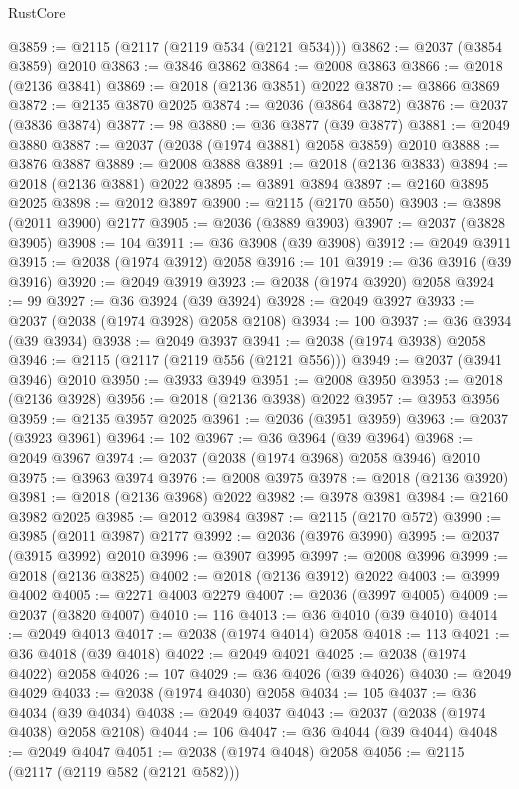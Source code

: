 \begin{lexlean}{RustCore}
\begin{coremodule}
@3859 := @2115 (@2117 (@2119 @534 (@2121 @534)))
@3862 := @2037 (@3854 @3859) @2010
@3863 := @3846 @3862
@3864 := @2008 @3863
@3866 := @2018 (@2136 @3841)
@3869 := @2018 (@2136 @3851) @2022
@3870 := @3866 @3869
@3872 := @2135 @3870 @2025
@3874 := @2036 (@3864 @3872)
@3876 := @2037 (@3836 @3874)
@3877 := 98
@3880 := @36 @3877 (@39 @3877)
@3881 := @2049 @3880
@3887 := @2037 (@2038 (@1974 @3881) @2058 @3859) @2010
@3888 := @3876 @3887
@3889 := @2008 @3888
@3891 := @2018 (@2136 @3833)
@3894 := @2018 (@2136 @3881) @2022
@3895 := @3891 @3894
@3897 := @2160 @3895 @2025
@3898 := @2012 @3897
@3900 := @2115 (@2170 @550)
@3903 := @3898 (@2011 @3900) @2177
@3905 := @2036 (@3889 @3903)
@3907 := @2037 (@3828 @3905)
@3908 := 104
@3911 := @36 @3908 (@39 @3908)
@3912 := @2049 @3911
@3915 := @2038 (@1974 @3912) @2058
@3916 := 101
@3919 := @36 @3916 (@39 @3916)
@3920 := @2049 @3919
@3923 := @2038 (@1974 @3920) @2058
@3924 := 99
@3927 := @36 @3924 (@39 @3924)
@3928 := @2049 @3927
@3933 := @2037 (@2038 (@1974 @3928) @2058 @2108)
@3934 := 100
@3937 := @36 @3934 (@39 @3934)
@3938 := @2049 @3937
@3941 := @2038 (@1974 @3938) @2058
@3946 := @2115 (@2117 (@2119 @556 (@2121 @556)))
@3949 := @2037 (@3941 @3946) @2010
@3950 := @3933 @3949
@3951 := @2008 @3950
@3953 := @2018 (@2136 @3928)
@3956 := @2018 (@2136 @3938) @2022
@3957 := @3953 @3956
@3959 := @2135 @3957 @2025
@3961 := @2036 (@3951 @3959)
@3963 := @2037 (@3923 @3961)
@3964 := 102
@3967 := @36 @3964 (@39 @3964)
@3968 := @2049 @3967
@3974 := @2037 (@2038 (@1974 @3968) @2058 @3946) @2010
@3975 := @3963 @3974
@3976 := @2008 @3975
@3978 := @2018 (@2136 @3920)
@3981 := @2018 (@2136 @3968) @2022
@3982 := @3978 @3981
@3984 := @2160 @3982 @2025
@3985 := @2012 @3984
@3987 := @2115 (@2170 @572)
@3990 := @3985 (@2011 @3987) @2177
@3992 := @2036 (@3976 @3990)
@3995 := @2037 (@3915 @3992) @2010
@3996 := @3907 @3995
@3997 := @2008 @3996
@3999 := @2018 (@2136 @3825)
@4002 := @2018 (@2136 @3912) @2022
@4003 := @3999 @4002
@4005 := @2271 @4003 @2279
@4007 := @2036 (@3997 @4005)
@4009 := @2037 (@3820 @4007)
@4010 := 116
@4013 := @36 @4010 (@39 @4010)
@4014 := @2049 @4013
@4017 := @2038 (@1974 @4014) @2058
@4018 := 113
@4021 := @36 @4018 (@39 @4018)
@4022 := @2049 @4021
@4025 := @2038 (@1974 @4022) @2058
@4026 := 107
@4029 := @36 @4026 (@39 @4026)
@4030 := @2049 @4029
@4033 := @2038 (@1974 @4030) @2058
@4034 := 105
@4037 := @36 @4034 (@39 @4034)
@4038 := @2049 @4037
@4043 := @2037 (@2038 (@1974 @4038) @2058 @2108)
@4044 := 106
@4047 := @36 @4044 (@39 @4044)
@4048 := @2049 @4047
@4051 := @2038 (@1974 @4048) @2058
@4056 := @2115 (@2117 (@2119 @582 (@2121 @582)))

\end{coremodule}
\end{lexlean}
